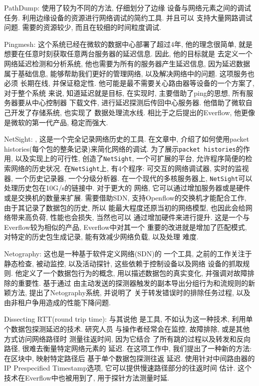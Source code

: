 {\begin{mdframed}[everyline=true]
PathDump: 使用了较为不同的方法,
仔细划分了边缘 设备与网络元素之间的调试任务.
利用边缘设备的资源进行网络调试的简约工具. 并且可以 支持大量网路调试问题.
需要的资源较少, 而且在较细的时间粒度调试.

Pingmesh: 
这个系统已经在微软的数据中心部署了超过4年, 他的理念很简单,
就是想要在任意时刻获取任意两台服务器的延迟信息. 因此, 他的目标就是
去定义一个网络延迟检测和分析系统, 他也需要为所有的服务器产生延迟信息,
因为延迟数据 属于基础信息, 能够帮助我们更好的管理网络,
以及解决网络中的问题. 这项服务也必须 长期在线, 并保证稳定性.
他可能是最不需要关心路由器等设备的一个方案了, 对于整个系统 来说,
知道延迟就是目标, 在实现时, 主要借助了ping的思想,
所有服务器要从中心控制器 下载文件, 进行延迟探测后传回中心服务器.
他借助了微软自己开发了存储系统, 也实现了 数据处理流水线.
相比于之后提出的Everflow, 他更像是微软的第一代产品, 稳定而强大.

NetSight: , 这是一个完全记录网络历史的工具.
在文章中, 介绍了如何使用packet
histories(每个包的整条记录)来简化网络的调试.
为了展示\texttt{packet\ histories}的作用, 以及实现上的可行性,
创造了\texttt{NetSight}, 一个可扩展的平台,
允许程序简便的检索网络的历史状况. 在\texttt{NetSight}上, 有4个程序:
可交互的网络调试器, 实时的监视器, 一个历史记录器, 一个分级分析器.
在一个现代的多核服务器上,
\texttt{NetSight}可以处理历史包在10G/s的链接中. 对于更大的 网络,
它可以通过增加服务器或是硬件 或是交换机的数量来扩展. 需要借助SDN,
支持Openflow的交换机才能配合工作, 由于其记录了数据包的历史, 所以
能最大程度还原当初的网络模型, 也因此会给网络带来高负荷, 性能也会损失,
当然也可以 通过增加硬件来进行提升. 这是一个与Everflow较为相似的产品,
Everflow中对其一个 重要的改进就是增加了匹配模式, 对特定的历史包生成记录,
能有效减少网络负载, 以及处理 难度.

Netography:  这也是一种基于软件定义网络(SDN)的
一个工具, 之前的工作关注于静态检查, 被动监控, 以及活动探针,
这些依赖于控制设备以及网络 设备的抓取规则. 他定义了一个数据包行为的概念,
用以描述数据包的真实变化, 并强调对故障排除的重要性. 基于通过
由主动发送的探测器触发的副本导出分组行为和流规则的新颖方法,
提出了Netography系统, 并说明了 关于转发错误时的排除任务过程,
以及由非租户争用造成的性能下降问题.

Dissecting RTT(round trip time):  与其说他
是工具, 不如认为这一种技术, 利用单个数据包探测延迟的技术. 研究人员
与操作者经常会在监控, 故障排除, 或是其他方式访问网络路径时 测量往返时间,
因为它结合 了所有跳的过程以及转发和反向路径, 很难去衡量特定网络元素的
延迟. 在这项工作中, 我们提出了一种新的方法: 在区块中, 映射特定路径后
基于单个数据包探测往返 延迟. 使用针对中间路由器的IP Prespecified
Timestamp选项, 它可以提供慢速路径部分的往返时间 估计.
这个技术在Everflow中也被用到了, 用于探针方法测量时延.


\end{mdframed}}
